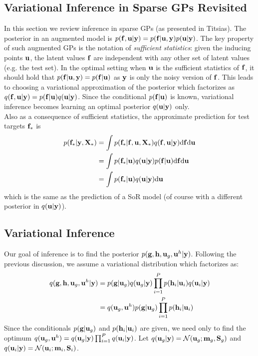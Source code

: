 \documentclass{article} %
\begin{document}
\subsection{Variational Inference in Sparse GPs Revisited}
In this section we review inference in sparse GPs (as presented in Titsias).
The posterior in an augmented model is $p(\mathbf{f}, \mathbf{u} | \mathbf{y}) = p(\mathbf{f} | \mathbf{u}, \mathbf{y}) p(\mathbf{u} | \mathbf{y})$.
The key property of such augmented GPs  is the notation of \textit{sufficient statistics}: given the inducing points $\mathbf{u}$, the latent values $\mathbf{f}$ are independent with any other set of latent values (e.g. the test set).
In the optimal setting when $\mathbf{u}$ is the sufficient statistics of $\mathbf{f}$, it should hold that $p(\mathbf{f} | \mathbf{u}, \mathbf{y}) = p(\mathbf{f} | \mathbf{u})$ as $\mathbf{y}$ is only the noisy version of $\mathbf{f}$.
This leads to choosing a variational approximation of the posterior which factorizes as $q(\mathbf{f}, \mathbf{u} | \mathbf{y}) = p(\mathbf{f} | \mathbf{u}) q(\mathbf{u} | \mathbf{y})$.
Since the conditional $p(\mathbf{f} | \mathbf{u})$ is known, variational inference becomes learning an optimal posterior $q(\mathbf{u} | \mathbf{y})$ only. \\

\noindent Also as a consequence of sufficient statistics, the approximate prediction for test targets $\mathbf{f}_*$ is
\begin{align}
\nonumber
p(\mathbf{f}_* | \mathbf{y}, \mathbf{X}_*) &= \int p(\mathbf{f}_* | \mathbf{f}, \mathbf{u}, \mathbf{X}_*) q(\mathbf{f}, \mathbf{u} | \mathbf{y}) \mathrm{d} \mathbf{f} \mathrm{d} \mathbf{u} \\
\nonumber
&= \int p(\mathbf{f}_* | \mathbf{u}) q(\mathbf{u}| \mathbf{y}) p(\mathbf{f} | \mathbf{u}) \mathrm{d} \mathbf{f} \mathrm{d} \mathbf{u} \\
\label{eq:sorprediction}
&= \int p(\mathbf{f}_* | \mathbf{u}) q(\mathbf{u}| \mathbf{y}) \mathrm{d} \mathbf{u}
\end{align}
which is the same as the prediction of a SoR model (of course with a different posterior in $q(\mathbf{u} | \mathbf{y})$). 

\subsection{Variational Inference}
\newcommand{\ug}{\u_g}
\newcommand{\uh}{\u^h}
Our goal of inference is to find the posterior $p(\g, \h, \ug, \uh | \y)$. 
Following the previous discussion, we assume a variational distribution which factorizes as:
\begin{align}
\nonumber
q(\g, \h, \ug, \uh | \y)
 &= p(\g | \ug) q(\ug | \y) \prod_{i=1}^P p(\h_i | \u_i) q(\u_i | \y) \\
 &=  q(\ug, \uh) p(\g | \ug) \prod_{i=1}^P p(\h_i | \u_i)
\end{align}
Since the conditionals $p(\g | \ug)$ and $p(\mathbf{h}_i | \mathbf{u}_i)$ are given, we need only to find the optimum $q(\ug, \uh) = q(\ug | \y) \prod_{i=1}^P q(\u_i | \y)$.
Let $q(\ug | \y) = \Normal(\ug; \m_g, \S_g)$ and $q(\mathbf{u}_i | \mathbf{y}) = \mathcal{N}(\mathbf{u}_i; \mathbf{m}_i, \mathbf{S}_i)$. \\
\end{document}
